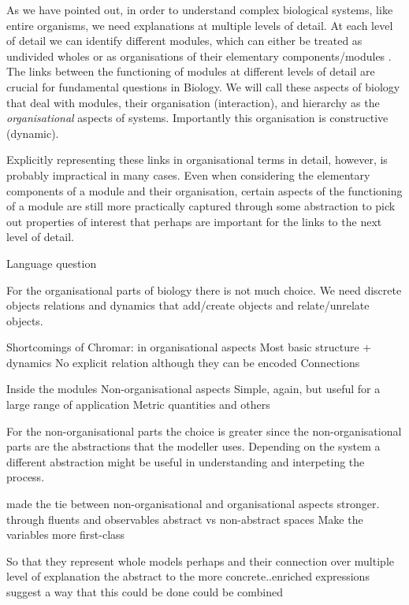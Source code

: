 \documentclass[phd]{infthesis}
\begin{document}
As we have pointed out, in order to understand complex biological systems, like
entire organisms, we need explanations at multiple levels of detail. At each
level of detail we can identify different modules, which can either be treated
as undivided wholes or as organisations of their elementary components/modules
\citep{varela_autopoiesis:_1974}. The links between the functioning of modules
at different levels of detail are crucial for fundamental questions in
Biology. We will call these aspects of biology that deal with modules, their
organisation (interaction), and hierarchy as the \emph{organisational} aspects
of systems. Importantly this organisation is constructive (dynamic).

Explicitly representing these links in organisational terms in detail, however,
is probably impractical in many cases. Even when considering the elementary
components of a module and their organisation, certain aspects of the
functioning of a module are still more practically captured through some
abstraction to pick out properties of interest that perhaps are important for
the links to the next level of detail.


Language question 



For the organisational parts of biology there is not much choice. We need
discrete objects relations and dynamics that add/create objects and
relate/unrelate objects.

Shortcomings of Chromar:
in organisational aspects
Most basic structure + dynamics
No explicit relation although they can be encoded
Connections

Inside the modules
Non-organisational aspects
Simple, again, but useful for a large range of application
Metric quantities and others

For the non-organisational parts the choice is greater since the
non-organisational parts are the abstractions that the modeller uses. Depending
on the system a different abstraction might be useful in understanding and
interpeting the process.

made the tie between non-organisational and organisational aspects
stronger. through fluents and observables
abstract vs non-abstract spaces
Make the variables more first-class

So that they represent whole models perhaps and their connection over multiple
level of explanation the abstract to the more concrete..enriched expressions
suggest a way that this could be done
could be combined
\end{document}

